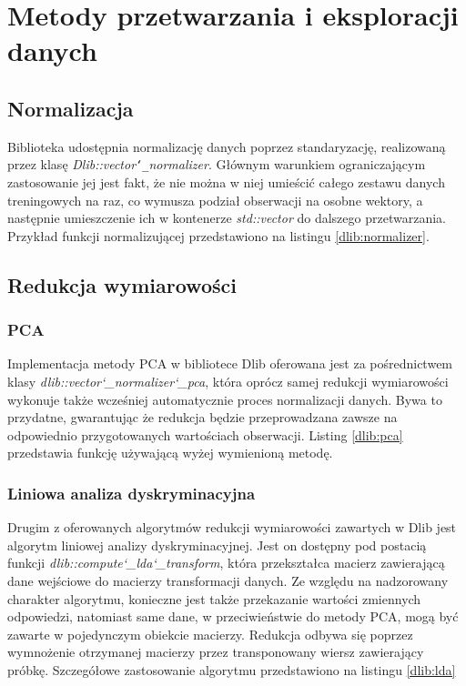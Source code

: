 \section{Metody przetwarzania i eksploracji danych}

\subsection{Normalizacja}
Biblioteka udostępnia normalizację danych poprzez standaryzację, realizowaną przez klasę \textit{Dlib::vector\texttt{\char`_}normalizer}. Głównym warunkiem ograniczającym zastosowanie jej jest fakt, że nie można w niej umieścić całego zestawu danych treningowych na raz, co wymusza podział obserwacji na osobne wektory, a następnie umieszczenie ich w kontenerze \textit{std::vector} do dalszego przetwarzania. Przykład funkcji normalizującej przedstawiono na listingu \ref{dlib:normalizer}.


\subsection{Redukcja wymiarowości}

\subsubsection{PCA}

Implementacja metody PCA w bibliotece Dlib oferowana jest za pośrednictwem klasy \textit{dlib::vector\char`_normalizer\char`_pca}, która oprócz samej redukcji wymiarowości wykonuje także wcześniej automatycznie proces normalizacji danych. Bywa to przydatne, gwarantując że redukcja będzie przeprowadzana zawsze na odpowiednio przygotowanych wartościach obserwacji. Listing \ref{dlib:pca} przedstawia funkcję używającą wyżej wymienioną metodę.


\subsubsection{Liniowa analiza dyskryminacyjna}

Drugim z oferowanych algorytmów redukcji wymiarowości zawartych w Dlib jest algorytm liniowej analizy dyskryminacyjnej. Jest on dostępny pod postacią funkcji \textit{dlib::compute\char`_lda\char`_transform}, która przekształca macierz zawierającą dane wejściowe do macierzy transformacji danych. Ze względu na nadzorowany charakter algorytmu, konieczne jest także przekazanie wartości zmiennych odpowiedzi, natomiast same dane, w przeciwieństwie do metody PCA, mogą być zawarte w pojedynczym obiekcie macierzy. Redukcja odbywa się poprzez wymnożenie otrzymanej macierzy przez transponowany wiersz zawierający próbkę. Szczegółowe zastosowanie algorytmu przedstawiono na listingu \ref{dlib:lda}

